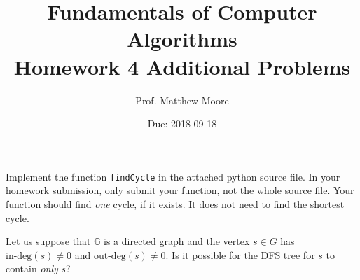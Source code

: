 \documentclass{exam} %
\newcommand{\m}[1]{\mathbb{#1}}    %
\theoremstyle{plain}
\theoremstyle{definition}
\theoremstyle{remark}
\numberwithin{equation}{section}  %
\begin{document}
\title{Fundamentals of Computer Algorithms \\ Homework 4 Additional Problems}
\author{Prof. Matthew Moore}
\date{Due: 2018-09-18}
\maketitle
\begin{questions}
\question Implement the function \verb|findCycle| in the attached python
source file. In your homework submission, only submit your function, not the
whole source file. Your function should find \emph{one} cycle, if it exists.
It does not need to find the shortest cycle.

\question Let us suppose that $\m{G}$ is a directed graph and the vertex
$s\in G$ has $\text{in-deg}(s) \neq 0$ and $\text{out-deg}(s)\neq 0$. Is it
possible for the DFS tree for $s$ to contain \emph{only} $s$?
\end{questions} 
\end{document}
